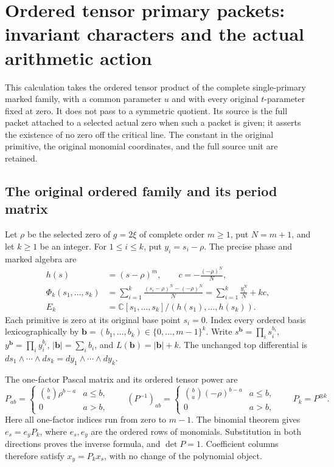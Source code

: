\section{Ordered tensor primary packets: invariant characters and the actual arithmetic action}
\label{CFStage:sec:tp-tensor}

This calculation takes the ordered tensor product of the complete
single-primary marked family, with a common parameter \(u\) and with
every original \(t\)-parameter fixed at zero. It does not pass to a
symmetric quotient. Its source is the full packet attached to a selected
actual zero when such a packet is given; it asserts the existence of no
zero off the critical line. The constant in the original primitive,
the original monomial coordinates, and the full source unit are retained.

\subsection{The original ordered family and its period matrix}

Let \(\rho\) be the selected zero of \(g=2\xi\) of complete order
\(m\geq1\), put \(N=m+1\), and let \(k\geq1\) be an integer.
For \(1\leq i\leq k\), put \(y_i=s_i-\rho\). The precise phase and
marked algebra are
\[
 \begin{split}
 h(s)&=(s-\rho)^m,\qquad c=-\frac{(-\rho)^N}{N},\\
 \Phi_k(s_1,\ldots,s_k)
  &=\sum_{i=1}^k\frac{(s_i-\rho)^N-(-\rho)^N}{N}
    =\sum_{i=1}^k\frac{y_i^N}{N}+kc,\\
 E_k&=\mathbb C[s_1,\ldots,s_k]/(h(s_1),\ldots,h(s_k)).
 \end{split}
 \tag{TP.1}\label{CFStage:eq:tp-family}
\]
Each primitive is zero at its original base point \(s_i=0\).
Index every ordered basis lexicographically by
\(\mathbf b=(b_1,\ldots,b_k)\in\{0,\ldots,m-1\}^k\).
Write \(s^{\mathbf b}=\prod_i s_i^{b_i}\),
\(y^{\mathbf b}=\prod_i y_i^{b_i}\),
\(|\mathbf b|=\sum_i b_i\), and
\(L(\mathbf b)=|\mathbf b|+k\).
The unchanged top differential is
\(ds_1\wedge\cdots\wedge ds_k=dy_1\wedge\cdots\wedge dy_k\).

The one-factor Pascal matrix and its ordered tensor power are
\[
 P_{ab}=\begin{cases}\binom ba\rho^{b-a}&a\leq b,\\0&a>b,
             \end{cases}\qquad
 (P^{-1})_{ab}=\begin{cases}\binom ba(-\rho)^{b-a}&a\leq b,\\0&a>b,
             \end{cases}\qquad
 P_k=P^{\otimes k}.
 \tag{TP.2}\label{CFStage:eq:tp-pascal}
\]
Here all one-factor indices run from zero to \(m-1\).
The binomial theorem gives \(e_s=e_yP_k\), where \(e_s,e_y\) are
the ordered rows of monomials. Substitution in both directions proves
the inverse formula, and \(\det P=1\). Coefficient columns therefore
satisfy \(x_y=P_kx_s\), with no change of the polynomial object.

